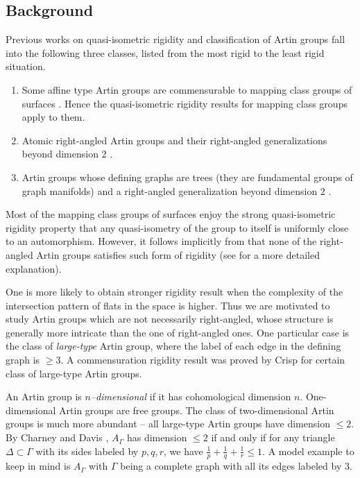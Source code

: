 \documentclass[11pt]{amsart}
\theoremstyle{definition}
\begin{document}
\subsection*{Background}
Previous works on quasi-isometric rigidity and classification of Artin groups fall into the following three classes, listed from the most rigid to the least rigid situation.
\begin{enumerate}
	\item Some affine type Artin groups are commensurable to mapping class groups of surfaces \cite{CharneyCrispAutomorphism}. Hence the quasi-isometric rigidity results for mapping class groups \cite{behrstock2012geometry,hamenstaedt2005geometry} apply to them.
	\item Atomic right-angled Artin groups \cite{bestvina2008asymptotic} and their right-angled generalizations beyond dimension 2 \cite{MR3692971,huang2016groups,huang2016commensurability,huang2016quasi}.
	\item Artin groups whose defining graphs are trees \cite{behrstock2008quasi} (they are fundamental groups of graph manifolds) and a right-angled generalization beyond dimension 2 \cite{MR2727658}.
\end{enumerate}
Most of the mapping class groups of surfaces enjoy the strong quasi-isometric rigidity property that any quasi-isometry of the group to itself is uniformly close to an automorphism. However, it follows implicitly from \cite[Section 11]{bestvina2008asymptotic} that none of the right-angled Artin groups satisfies such form of rigidity (see \cite[Example 4.14]{MR3692971} for a more detailed explanation). 

One is more likely to obtain stronger rigidity result when the complexity of the intersection pattern of flats in the space is higher. Thus we are motivated to study Artin groups which are not necessarily right-angled, whose structure is generally more intricate than the one of right-angled ones. One particular case is the class of \emph{large-type} Artin group, where the label of each edge in the defining graph is $\ge 3$. A commensuration rigidity result was proved by Crisp \cite{MR2174269} for certain class of large-type Artin groups. 

An Artin group is \emph{$n$--dimensional} if it has cohomological dimension $n$. One-dimensional Artin groups are free groups. The class of two-dimensional Artin groups is much more abundant -- all large-type Artin groups have dimension $\le 2$. By Charney and Davis \cite{CharneyDavis}, $A_\Gamma$ has dimension $\le 2$ if and only if for any triangle $\Delta\subset\Gamma$ with its sides labeled by $p,q,r$, we have $\frac{1}{p}+\frac{1}{q}+\frac{1}{r}\le 1$. A model example to keep in mind is $A_\Gamma$ with $\Gamma$ being a complete graph with all its edges labeled by $3$.
\end{document}
